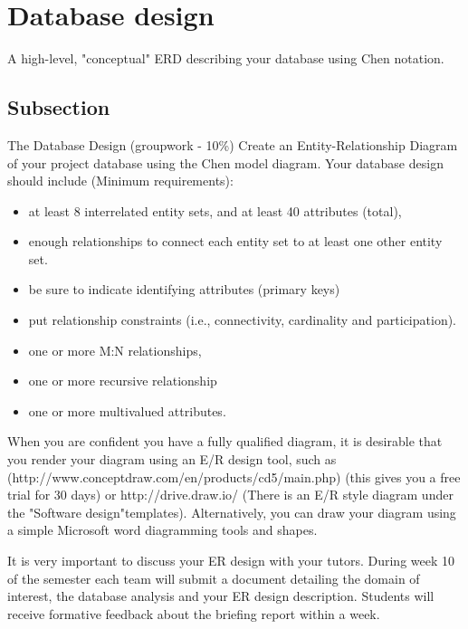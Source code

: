 \section{Database design}\label{Section label}
A high-level, "conceptual" ERD describing your database using Chen notation.
\subsection{Subsection}\label{subsection}
The Database Design (groupwork - 10\%) \newline
Create an Entity-Relationship Diagram of your project database using the Chen model
diagram. Your database design should include (Minimum requirements):
\begin{itemize}
    \item at least 8 interrelated entity sets, and at least 40 attributes (total),
    \item enough relationships to connect each entity set to at least one other entity set.
    \item be sure to indicate identifying attributes (primary keys)
    \item put relationship constraints (i.e., connectivity, cardinality and participation).
    \item one or more M:N relationships,
    \item one or more recursive relationship
    \item one or more multivalued attributes.
\end{itemize}

When you are confident you have a fully qualified diagram, it is desirable that you render your diagram using an E/R design tool, such as \newline(http://www.conceptdraw.com/en/products/cd5/main.php) (this gives you a free trial for 30 days) or http://drive.draw.io/ (There is an E/R style diagram under the "Software design"templates). Alternatively, you can draw your diagram using a simple Microsoft word diagramming tools and shapes.

It is very important to discuss your ER design with your tutors. During week 10 of the semester each team will submit a document detailing the domain of interest, the database analysis and your ER design description. Students will receive formative feedback about the briefing report within a week.